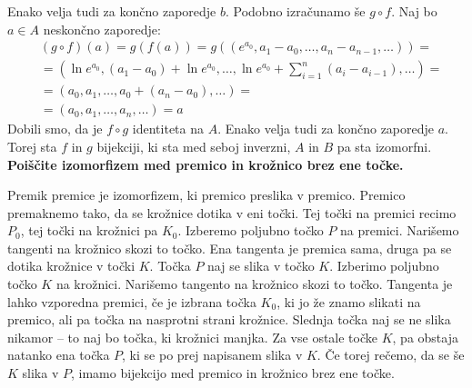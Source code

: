\documentclass[12pt]{article}
\begin{document}
    Enako velja tudi za končno zaporedje \(b\). Podobno izračunamo še \(g \circ f\). Naj bo \(a \in A\) neskončno zaporedje:
    \begin{align*}
        & (g \circ f)(a) = g(f(a)) = g\left(\left(e^{a_0}, a_1 - a_0, \dots, a_n  - a_{n - 1}, \dots\right)\right) = \\
        &= \left(\ln e^{a_0}, \left(a_1 - a_0\right) + \ln e^{a_0}, \dots, \ln e^{a_0} + \sum_{i=1}^{n}\left(a_i - a_{i - 1}\right), \dots\right) = \\
        &= \left(a_0, a_1, \dots, a_0 + (a_n - a_0), \dots\right) = \\
        &= \left(a_0, a_1, \dots, a_n, \dots\right) = a
    \end{align*}
    Dobili smo, da je \(f \circ g\) identiteta na \(A\). Enako velja tudi za končno zaporedje \(a\). Torej sta \(f\) in \(g\) bijekciji, ki sta med seboj inverzni,
    \(A\) in \(B\) pa sta izomorfni. 
    \\

    \textbf{Poiščite izomorfizem med premico in krožnico brez ene točke.}

    \begin{figure*}[h!]
        \centering
    \end{figure*}
    Premik premice je izomorfizem, ki premico preslika v premico. Premico premaknemo tako, da se krožnice dotika v eni točki. Tej točki na premici recimo \(P_0\),
    tej točki na krožnici pa \(K_0\). Izberemo poljubno točko \(P\) na premici. Narišemo tangenti na krožnico skozi to točko. Ena tangenta je premica sama, druga pa se dotika
    krožnice v točki \(K\). Točka \(P\) naj se slika v točko \(K\). Izberimo poljubno točko \(K\) na krožnici. Narišemo tangento na krožnico skozi to točko. 
    Tangenta je lahko vzporedna premici, če je izbrana točka \(K_0\), ki jo že znamo slikati na premico, ali pa točka na nasprotni strani krožnice. Slednja točka
    naj se ne slika nikamor -- to naj bo točka, ki krožnici manjka. Za vse ostale točke \(K\), pa obstaja natanko ena točka \(P\), ki se po prej napisanem slika v \(K\).
    Če torej rečemo, da se še \(K\) slika v \(P\), imamo bijekcijo med premico in krožnico brez ene točke.
\end{document}
